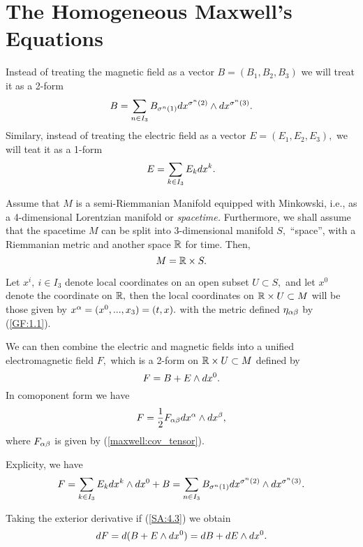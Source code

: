 \section{The Homogeneous Maxwell's Equations}

Instead of treating the magnetic field as a vector $B=(B_{1}, B_{2}, B_{3})$ we will treat it as a 2-form
\begin{equation}
 \label{SA:4.1}
B=\sum_{n \in I_{3}} B_{\sigma^{n}(1)} dx^{\sigma^{n}(2)} \wedge dx^{\sigma^{n}(3)}.
\end{equation}
Similary, instead of treating the electric field as a vector $E=(E_{1},E_{2},E_{3}),$ we will teat it as a 1-form
\begin{equation}
 \label{SA:4.2}
E=\sum_{k \in I_{3}}E_{k}dx^{k}.
\end{equation}

Assume that $M$ is a semi-Riemmanian Manifold equipped with Minkowski, i.e., as a 4-dimensional Lorentzian manifold or \emph{spacetime.} Furthermore, we shall assume that the spacetime $M$ can be split into 3-dimensional manifold $S,$ ``space'', with a Riemmanian metric and another space $\mathbb R$ for time. Then,
$$
M=\mathbb R \times S.
$$

Let $x^{i}, \ i \in I_{3}$ denote local coordinates on an open subset $U \subset S,$ and let $x^{0}$ denote the
coordinate on $\mathbb R,$ then the local coordinates on $\mathbb R \times U \subset M$ will be those given by
$x^{\alpha}=(x^{0},...,x_{3})=(t,x).$ with the metric defined $\eta_{\alpha \beta}$ by (\ref{GF:1.1}).

We can then combine the electric and magnetic fields into a unified electromagnetic field $F,$ which is a 2-form on $\mathbb R \times U \subset M$ defined by
\begin{equation}
 \label{SA:4.3}
F=B+E\wedge dx^{0}.
\end{equation}
In comoponent form we have
\begin{equation}
 \label{SA:4.4}
F=\frac{1}{2}F_{\alpha \beta} dx^{\alpha} \wedge dx^{\beta},
\end{equation}
where $F_{\alpha \beta}$ is given by (\ref{maxwell:cov_tensor}). 

Explicity, we have
\begin{equation}
 \label{SA:4.5}
F= \sum_{k \in I_{3}}E_{k}dx^{k}\wedge dx^{0} + B=\sum_{n \in I_{3}} B_{\sigma^{n}(1)}  dx^{\sigma^{n}(2)} \wedge dx^{\sigma^{n}(3)}.
\end{equation}


Taking the exterior derivative if (\ref{SA:4.3}) we obtain
\begin{equation}
 \label{SA:4.6}
dF=d(B+E\wedge dx^{0})=dB+dE\wedge dx^{0}.
\end{equation}

